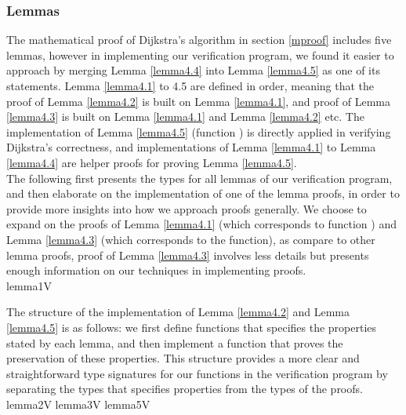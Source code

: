 \subsubsection{Lemmas} \label{lemmas}
The mathematical proof of Dijkstra's algorithm in section \ref{mproof} includes five lemmas, however in implementing our verification program, we found it easier to approach by merging Lemma \ref{lemma4.4} into Lemma \ref{lemma4.5} as one of its statements. Lemma \ref{lemma4.1} to 4.5 are defined in order, meaning that the proof of Lemma \ref{lemma4.2} is built on Lemma \ref{lemma4.1}, and proof of Lemma \ref{lemma4.3} is built on Lemma \ref{lemma4.1} and Lemma \ref{lemma4.2} etc. The implementation of Lemma \ref{lemma4.5} (function ) is directly applied in verifying Dijkstra's correctness, and implementations of Lemma \ref{lemma4.1} to Lemma \ref{lemma4.4} are helper proofs for proving Lemma \ref{lemma4.5}.
\\

The following first presents the types for all lemmas of our verification program, and then elaborate on the implementation of one of the lemma proofs, in order to provide more insights into how we approach proofs generally. We choose to expand on the proofs of Lemma \ref{lemma4.1} (which corresponds to function ) and Lemma \ref{lemma4.3} (which corresponds to the  function), as compare to other lemma proofs, proof of Lemma \ref{lemma4.3} involves less details but presents enough information on our techniques in implementing proofs. 
\\

{lemma1V}

The structure of the implementation of Lemma \ref{lemma4.2} and Lemma \ref{lemma4.5} is as follows: we first define functions that specifies the  properties stated by each lemma, and then implement a function that proves the preservation of these properties. This structure provides a more clear and straightforward type signatures for our functions in the verification program by separating the types that specifies  properties from the types of the proofs. 
\\

{lemma2V}
{lemma3V}
{lemma5V}